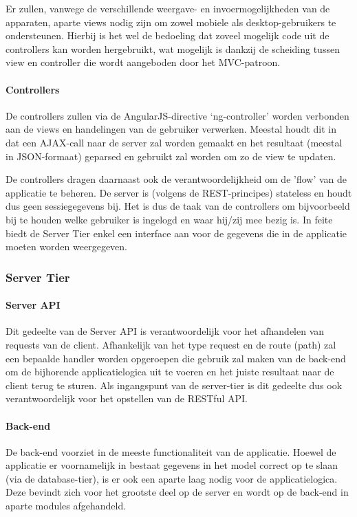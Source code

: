 \documentclass{article}
\begin{document}
Er zullen, vanwege de verschillende weergave- en invoermogelijkheden van de apparaten, aparte views nodig zijn om zowel mobiele als desktop-gebruikers te ondersteunen. Hierbij is het wel de bedoeling dat zoveel mogelijk code uit de controllers kan worden hergebruikt, wat mogelijk is dankzij de scheiding tussen view en controller die wordt aangeboden door het MVC-patroon.

\paragraph{Controllers} 
De controllers zullen via de AngularJS-directive `ng-controller' worden verbonden aan de views en handelingen van de gebruiker verwerken. Meestal houdt dit in dat een AJAX-call naar de server zal worden gemaakt en het resultaat (meestal in JSON-formaat) geparsed en gebruikt zal worden om zo de view te updaten.

De controllers dragen daarnaast ook de verantwoordelijkheid om de 'flow' van de applicatie te beheren. De server is (volgens de REST-principes) stateless en houdt dus geen sessiegegevens bij. Het is dus de taak van de controllers om bijvoorbeeld bij te houden welke gebruiker is ingelogd en waar hij/zij mee bezig is. In feite biedt de Server Tier enkel een interface aan voor de gegevens die in de applicatie moeten worden weergegeven.

\subsubsection{Server Tier}

\paragraph{Server API} 
Dit gedeelte van de Server API is verantwoordelijk voor het afhandelen van requests van de client. Afhankelijk van het type request en de route (path) zal een bepaalde handler worden opgeroepen die gebruik zal maken van de back-end om de bijhorende applicatielogica uit te voeren en het juiste resultaat naar de client terug te sturen. Als ingangspunt van de server-tier is dit gedeelte dus ook verantwoordelijk voor het opstellen van de RESTful API.

\paragraph{Back-end} 
De back-end voorziet in de meeste functionaliteit van de applicatie. Hoewel de applicatie er voornamelijk in bestaat gegevens in het model correct op te slaan (via de database-tier), is er ook een aparte laag nodig voor de applicatielogica. Deze bevindt zich voor het grootste deel op de server en wordt op de back-end in aparte modules afgehandeld.
\end{document}
